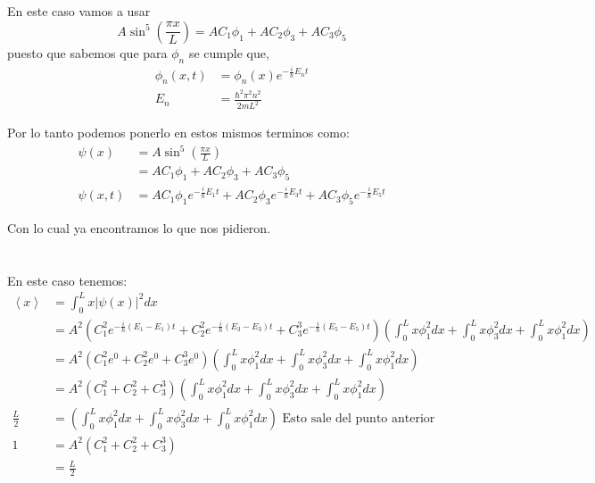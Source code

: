 \documentclass{report}
\begin{document}
\section{}

En este caso vamos a usar \[
  A \sin^5\left(\frac{\pi x}{L}\right) = AC_1\phi_1 + AC_2\phi_3 + AC_3\phi_5
\] puesto que sabemos que para $\phi_n$ se cumple que,
\begin{align*}
  \phi_n(x, t) &= \phi_n(x)e^{- \frac{i}{\hbar}E_n t}\\
  E_n &= \frac{\hbar^2 \pi^2 n^2}{2m L^2}
\end{align*}

Por lo tanto podemos ponerlo en estos mismos terminos como:
\begin{align*}
  \psi(x) &= A \sin^5\left(\frac{\pi x}{L}\right)\\
  &= AC_1\phi_1 + AC_2\phi_3 + AC_3\phi_5\\
  \psi\left(x, t\right) &= AC_1\phi_1e^{- \frac{i}{\hbar}E_1 t} + AC_2\phi_3e^{- \frac{i}{\hbar}E_3 t} + AC_3\phi_5e^{- \frac{i}{\hbar}E_5 t}
\end{align*}

Con lo cual ya encontramos lo que nos pidieron.

\section{}
\subsection{}

En este caso tenemos:
\begin{align*}
  \left<x\right> &= \int_0^L x\left|\psi(x)\right|^2 dx\\
  &= A^2\left(C_1^2 e^{- \frac{i}{\hbar}(E_1 - E_1) t}+ C_2^2e^{- \frac{i}{\hbar}(E_3 - E_3) t} + C_3^3e^{- \frac{i}{\hbar}(E_5 - E_5) t}\right) \left(\int_0^L x\phi_1^2 dx + \int_0^L x\phi_3^2 dx+ \int_0^L x\phi_1^2 dx\right)\\
  &= A^2\left(C_1^2 e^{0}+ C_2^2e^{0} + C_3^3e^{0}\right) \left(\int_0^L x\phi_1^2 dx + \int_0^L x\phi_3^2 dx+ \int_0^L x\phi_1^2 dx\right)\\
  &= A^2\left(C_1^2 + C_2^2 + C_3^3\right) \left(\int_0^L x\phi_1^2 dx + \int_0^L x\phi_3^2 dx+ \int_0^L x\phi_1^2 dx\right)\\
  \frac{L}{2} &= \left(\int_0^L x\phi_1^2 dx + \int_0^L x\phi_3^2 dx+ \int_0^L x\phi_1^2 dx\right) \text{ Esto sale del punto anterior}\\
  1 &= A^2\left(C_1^2 + C_2^2 + C_3^3\right) \\
  &= \frac{L}{2}
\end{align*}
\end{document}
